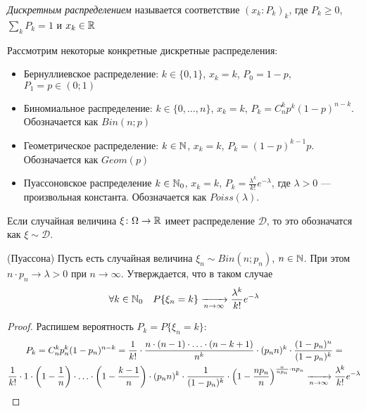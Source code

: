 \begin{definition}
	\textit{Дискретным распределением} называется соответствие $(x_k \colon P_k)_k$, где $P_k \ge 0$, $\sum_k P_k = 1$ и $x_k \in \mathbb{R}$
\end{definition}

Рассмотрим некоторые конкретные дискретные распределения:
\begin{itemize}
	\item Бернуллиевское распределение: $k \in \{0, 1\}$, $x_k = k$, $P_0 = 1 - p$, $P_1 = p \in (0; 1)$
	
	\item Биномиальное распределение: $k \in \{0, \ldots, n\}$, $x_k = k$, $P_k = C_n^k p^k (1 - p)^{n - k}$. Обозначается как $Bin(n; p)$
	
	\item Геометрическое распределение: $k \in \mathbb{N}$, $x_k = k$, $P_k = (1 - p)^{k - 1}p$. Обозначается как $Geom(p)$
	
	\item Пуассоновское распределение $k \in \mathbb{N}_0$, $x_k = k$, $P_k = \frac{\lambda^k}{k!}e^{-\lambda}$, где $\lambda > 0$ --- произвольная константа. Обозначается как $Poiss(\lambda)$.
\end{itemize}

\begin{designation}
	Если случайная величина $\xi \colon \Omega \to \mathbb{R}$ имеет распределение $\mathcal{D}$, то это обозначатся как $\xi \sim \mathcal{D}$.
\end{designation}

\begin{theorem} (Пуассона)
	Пусть есть случайная величина $\xi_n \sim Bin(n; p_n)$, $n \in \mathbb{N}$. При этом $n \cdot p_n \to \lambda > 0$ при $n \to \infty$. Утверждается, что в таком случае
	\[
		\forall k \in \mathbb{N}_0 \quad P\{\xi_n = k\} \xrightarrow[n \to \infty]{} \frac{\lambda^k}{k!}e^{-\lambda}
	\]
\end{theorem}

\begin{proof}
	Распишем вероятность $P_k = P\{\xi_n = k\}$:
	\begin{multline*}
		P_k = C_n^k p_n^k (1 - p_n)^{n - k} = \frac{1}{k!} \cdot \frac{n \cdot (n - 1) \cdot \ldots \cdot (n - k + 1)}{n^k} \cdot (p_n n)^k \cdot \frac{(1 - p_n)^n}{(1 - p_n)^k} =
		\\
		\frac{1}{k!} \cdot 1 \cdot \left(1 - \frac{1}{n}\right) \cdot \ldots \cdot \left(1 - \frac{k - 1}{n}\right) \cdot (p_n n)^k \cdot \frac{1}{(1 - p_n)^k} \cdot \left(1 - \frac{np_n}{n}\right)^{\frac{n}{np_n} \cdot np_n} \xrightarrow[n \to \infty]{} \frac{\lambda^k}{k!}e^{-\lambda}
	\end{multline*}
\end{proof}

